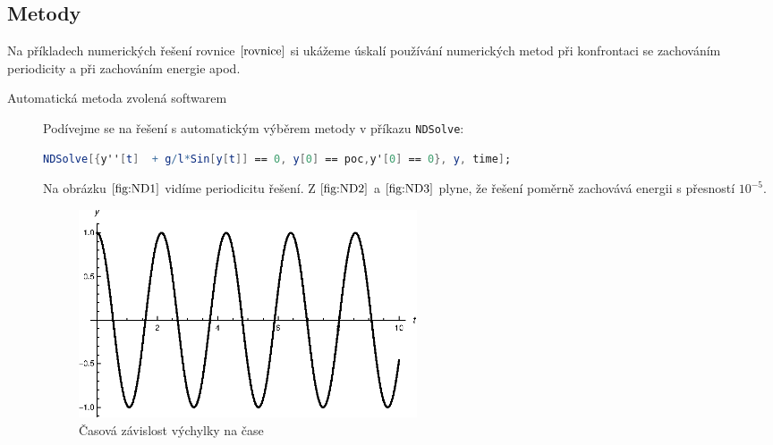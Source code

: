 \subsection{Metody}
\label{sec:Metody}

Na příkladech numerických řešení rovnice $\eqref{rovnice}$ si ukážeme úskalí používání numerických metod při konfrontaci se zachováním periodicity a při zachováním energie apod. 

\begin{description}
\item[Automatická metoda zvolená softwarem] Podívejme se na řešení s automatickým výběrem metody v příkazu \texttt{NDSolve}:

\begin{lstlisting}[language=Mathematica]
NDSolve[{y''[t]  + g/l*Sin[y[t]] == 0, y[0] == poc,y'[0] == 0}, y, time];
\end{lstlisting}

Na obrázku $\eqref{fig:ND1}$ vidíme periodicitu řešení. Z $\eqref{fig:ND2}$ a $\eqref{fig:ND3}$ plyne, že řešení poměrně zachovává energii s přesností $10^{-5}$.

\begin{figure}[h]
  \centering
  \includegraphics[width=10cm]{figures/ND1.eps}
  \caption{Časová závislost výchylky na čase}
  \label{fig:ND1}
\end{figure}


\end{description}
